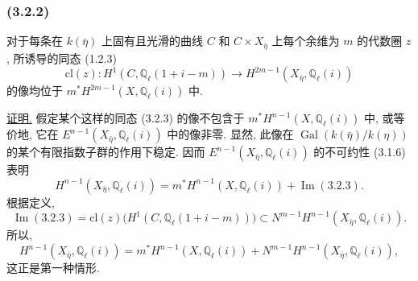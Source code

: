 \subsubsection*{(3.2.2)}
对于每条在 $k(\bar\eta)$ 上固有且光滑的曲线 $C$ 和 $C\times X_{\bar\eta}$ 上每个余维为 $m$ 的代数圈 $z$, 所诱导的同态 (1.2.3)
\begin{equation}\tag{3.2.3}
\mathrm{cl}(z):H^1(C,\mathbb Q_\ell(1+i-m))
\longrightarrow H^{2m-1}(X_{\bar\eta},\mathbb Q_\ell(i))
\end{equation}
的像均位于 $m^*H^{2m-1}(X,\mathbb Q_\ell(i))$ 中.

\noindent\underline{证明.}
假定某个这样的同态 (3.2.3) 的像不包含于 $m^*H^{n-1}(X,\mathbb Q_\ell(i))$ 中, 或等价地, 它在 $E^{n-1}(X_{\bar\eta},\mathbb Q_\ell(i))$ 中的像非零. 显然, 此像在 $\operatorname{Gal}(k(\bar\eta)/k(\eta))$ 的某个有限指数子群的作用下稳定. 因而 $E^{n-1}(X_{\bar\eta},\mathbb Q_\ell(i))$ 的不可约性 (3.1.6) 表明
\begin{equation*}
H^{n-1}(X_{\bar\eta},\mathbb Q_\ell(i))
=m^*H^{n-1}(X,\mathbb Q_\ell(i))+\operatorname{Im}(3.2.3).
\end{equation*}
根据定义,
\begin{equation*}
\operatorname{Im}(3.2.3)
=\mathrm{cl}(z)\bigl(H^1(C,\mathbb Q_\ell(1+i-m))\bigr)
\subset N^{m-1}H^{n-1}(X_{\bar\eta},\mathbb Q_\ell(i)).
\end{equation*}
所以,
\begin{equation*}
H^{n-1}(X_{\bar\eta},\mathbb Q_\ell(i))
=m^*H^{n-1}(X,\mathbb Q_\ell(i))
+N^{m-1}H^{n-1}(X_{\bar\eta},\mathbb Q_\ell(i)),
\end{equation*}
这正是第一种情形.
